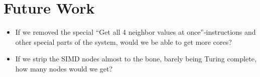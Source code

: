 \section{Future Work}

\begin{itemize}
\item If we removed the special ``Get all 4 neighbor values at
  once''-instructions and other special parts of the system, would we be able to
  get more cores?
\item If we strip the \ac{SIMD} nodes almost to the bone, barely being Turing
  complete, how many nodes would we get?
\end{itemize}
